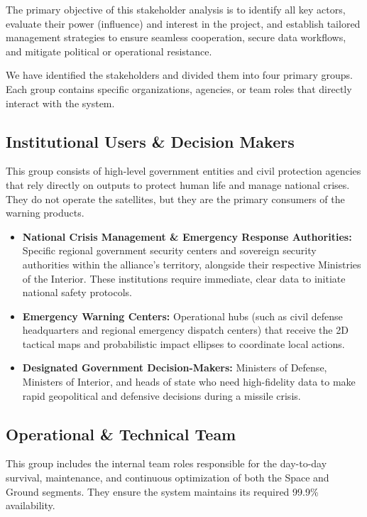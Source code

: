 The primary objective of this stakeholder analysis is to identify all key actors, evaluate their power (influence) and interest in the project, and establish tailored management strategies to ensure seamless cooperation, secure data workflows, and mitigate political or operational resistance.

We have identified the stakeholders and divided them into four primary groups. Each group contains specific organizations, agencies, or team roles that directly interact with the system.

\subsection{Institutional Users \& Decision Makers}

This group consists of high-level government entities and civil protection agencies that rely directly on  outputs to protect human life and manage national crises. They do not operate the satellites, but they are the primary consumers of the warning products.

\begin{itemize}
    \item \textbf{National Crisis Management \& Emergency Response Authorities:} Specific regional government security centers and sovereign security authorities within the alliance's territory, alongside their respective Ministries of the Interior. These institutions require immediate, clear data to initiate national safety protocols.
    
    \item \textbf{Emergency Warning Centers:} Operational hubs (such as civil defense headquarters and regional emergency dispatch centers) that receive the 2D tactical maps and probabilistic impact ellipses to coordinate local actions.
    
    \item \textbf{Designated Government Decision-Makers:} Ministers of Defense, Ministers of Interior, and heads of state who need high-fidelity data to make rapid geopolitical and defensive decisions during a missile crisis.
\end{itemize}

\subsection{Operational \& Technical Team}

This group includes the internal team roles responsible for the day-to-day survival, maintenance, and continuous optimization of both the Space and Ground segments. They ensure the system maintains its required 99.9\% availability.

